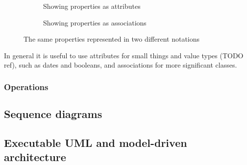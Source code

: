 \begin{figure}
\centering
\begin{subfigure}{.5\textwidth}
  \centering
  \caption{Showing properties as attributes}
  \label{fig:attributesAssociations:sub1}
\end{subfigure}%
\begin{subfigure}{.5\textwidth}
  \centering
  \caption{Showing properties as associations}
  \label{fig:attributesAssociations:sub2}
\end{subfigure}
\caption{The same properties represented in two different notations}
\label{fig:attributesAssociations}
\end{figure}

In general it is useful to use attributes for small things and value types (TODO ref), such as dates and booleans, and associations for more significant classes.

\subsubsection{{Operations}}

\subsection{Sequence diagrams}


\subsection{Executable UML and model-driven architecture}